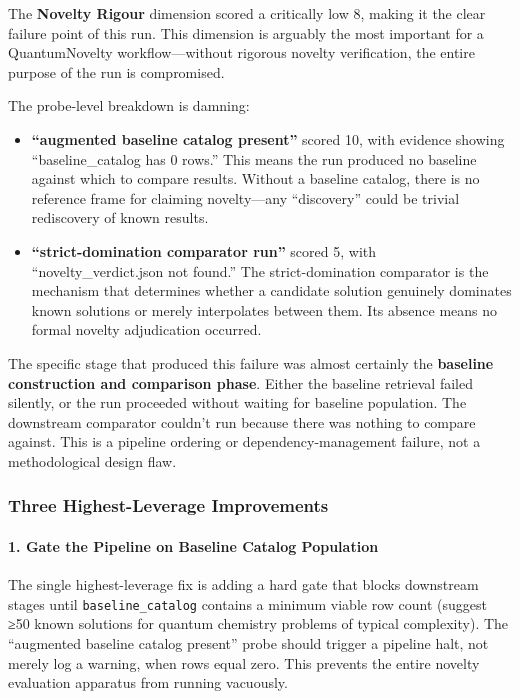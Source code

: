 \documentclass[10pt,letterpaper]{article}
\begin{document}
The \textbf{Novelty Rigour} dimension scored a critically low 8, making it the clear failure point of this run. This dimension is arguably the most important for a QuantumNovelty workflow---without rigorous novelty verification, the entire purpose of the run is compromised.

The probe-level breakdown is damning:

\begin{itemize}
\item
  \textbf{``augmented baseline catalog present''} scored 10, with evidence showing ``baseline\_catalog has 0 rows.'' This means the run produced no baseline against which to compare results. Without a baseline catalog, there is no reference frame for claiming novelty---any ``discovery'' could be trivial rediscovery of known results.
\item
  \textbf{``strict-domination comparator run''} scored 5, with ``novelty\_verdict.json not found.'' The strict-domination comparator is the mechanism that determines whether a candidate solution genuinely dominates known solutions or merely interpolates between them. Its absence means no formal novelty adjudication occurred.
\end{itemize}

The specific stage that produced this failure was almost certainly the \textbf{baseline construction and comparison phase}. Either the baseline retrieval failed silently, or the run proceeded without waiting for baseline population. The downstream comparator couldn't run because there was nothing to compare against. This is a pipeline ordering or dependency-management failure, not a methodological design flaw.

\hypertarget{three-highest-leverage-improvements}{%
\subsubsection{Three Highest-Leverage Improvements}\label{three-highest-leverage-improvements}}

\hypertarget{gate-the-pipeline-on-baseline-catalog-population}{%
\paragraph{1. Gate the Pipeline on Baseline Catalog Population}\label{gate-the-pipeline-on-baseline-catalog-population}}

The single highest-leverage fix is adding a hard gate that blocks downstream stages until \texttt{baseline\_catalog} contains a minimum viable row count (suggest ≥50 known solutions for quantum chemistry problems of typical complexity). The ``augmented baseline catalog present'' probe should trigger a pipeline halt, not merely log a warning, when rows equal zero. This prevents the entire novelty evaluation apparatus from running vacuously.
\end{document}
